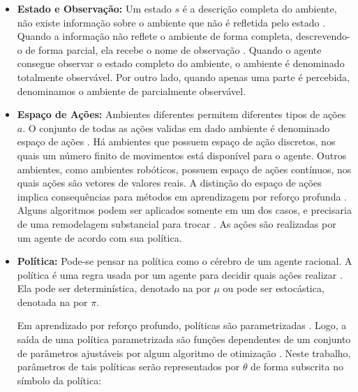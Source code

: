 \begin{itemize}
    \item \textbf{Estado e Observação:} Um estado $s$ é a descrição completa do ambiente, não existe informação sobre o ambiente que não é refletida pelo estado \cite{rl_intro}. Quando a informação não reflete o ambiente de forma completa, descrevendo-o de forma parcial, ela recebe o nome de observação \cite{machinelearning}. Quando o agente consegue observar o estado completo do ambiente, o ambiente é denominado totalmente observável. Por outro lado, quando apenas uma parte é percebida, denominamos o ambiente de parcialmente observável.
    
    \item \textbf{Espaço de Ações:} Ambientes diferentes permitem diferentes tipos de ações $a$. O conjunto de todas as ações validas em dado ambiente é denominado espaço de ações \cite{rl_intro}. Há ambientes que possuem espaço de ação discretos, nos quais um número finito de movimentos está disponível para o agente. Outros ambientes, como ambientes robóticos, possuem espaço de ações contínuos, nos quais ações são vetores de valores reais. A distinção do espaço de ações implica consequências para métodos em aprendizagem por reforço profunda \cite{SpinningUp2018}. Alguns algoritmos podem ser aplicados somente em um dos casos, e precisaria de uma remodelagem substancial para trocar \cite{SpinningUp2018}. As ações são realizadas por um agente de acordo com sua política.

    \item \textbf{Política:} Pode-se pensar na política como o cérebro de um agente racional. A política é uma regra usada por um agente para decidir quais ações realizar \cite{machinelearning}. Ela pode ser determinística, denotado na  por $\mu$ ou pode ser estocástica, denotada na  por $\pi$.


    Em aprendizado por reforço profundo, políticas são parametrizadas \cite{deeprl}. Logo, a saída de uma política parametrizada são funções dependentes de um conjunto de parâmetros ajustáveis por algum algoritmo de otimização \cite{deeprl}. Neste trabalho, parâmetros de tais políticas serão representados por $\theta$ de forma subscrita no símbolo da política:

    

\end{itemize}
